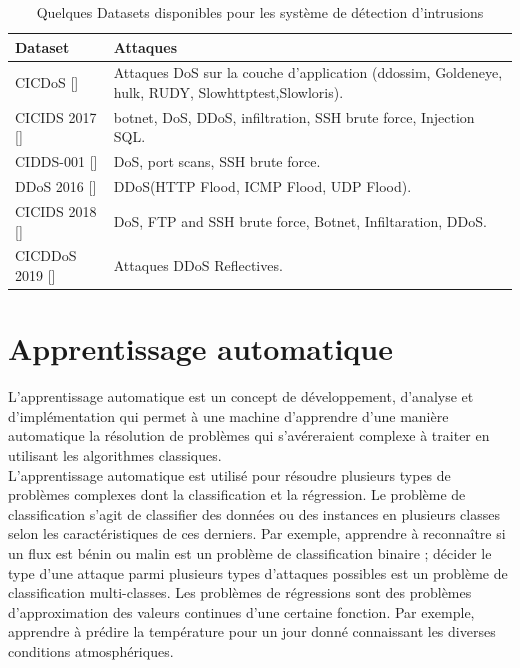 \begin{table}[h]
\begin{center}
\begin{tabular}{   m{4cm} | m{10cm}  }
\textbf{Dataset} & \textbf{Attaques}\\
\hline
\rowcolor[rgb]{0.85,0.85,0.85}
CICDoS [\cite{13}]  & Attaques DoS sur la couche d'application (ddossim, Goldeneye, hulk, RUDY, Slowhttptest,Slowloris).\\
\hline
CICIDS 2017 [\cite{14}] & botnet, DoS, DDoS, infiltration, SSH brute force, Injection SQL.\\
\hline
\rowcolor[rgb]{0.85,0.85,0.85}
CIDDS-001 [\cite{15}] & DoS, port scans, SSH brute force.\\
\hline
DDoS 2016 [\cite{16}] & DDoS(HTTP Flood, ICMP Flood, UDP Flood).\\
\hline 
\rowcolor[rgb]{0.85,0.85,0.85}
CICIDS 2018 [\cite{17}] & DoS, FTP and SSH brute force, Botnet, Infiltaration, DDoS.\\
\hline
CICDDoS 2019 [\cite{18}] & Attaques DDoS Reflectives.\\
\hline
\end{tabular}
\caption{Quelques Datasets disponibles pour les système de détection d'intrusions}
\end{center}
\label{table:Datasets}
\end{table}


\newpage
\section{Apprentissage automatique}
L’apprentissage automatique est un concept de développement, d’analyse et d’implémentation qui permet à une machine d’apprendre d’une manière automatique la résolution de problèmes qui s’avéreraient complexe à traiter en utilisant les algorithmes classiques.\\

\noindent L’apprentissage automatique est utilisé pour résoudre plusieurs types de problèmes complexes dont la classification et la régression. Le problème de classification s’agit de classifier des données ou des instances en plusieurs classes selon les caractéristiques de ces derniers. Par exemple, apprendre à reconnaître si un flux est bénin ou malin est un problème de classification binaire ; décider le type d’une attaque parmi plusieurs types d’attaques possibles est un problème de classification multi-classes. Les problèmes de régressions sont des problèmes d’approximation des valeurs continues d’une certaine fonction. Par exemple, apprendre à prédire la température pour un jour donné connaissant les diverses conditions atmosphériques.\\

